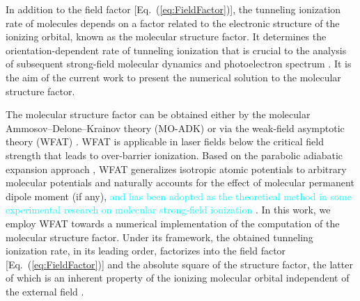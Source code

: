 \documentclass[preprint,12pt]{elsarticle} %
\newcommand{\cyan}[1]{\textcolor{cyan}{#1}}     %
\begin{document}
In addition to the field factor [Eq.~(\ref{eq:FieldFactor})], the tunneling ionization rate of molecules depends on a factor related to the electronic structure of the ionizing orbital, known as the molecular structure factor. It determines the orientation-dependent rate of tunneling ionization that is crucial to the analysis of subsequent strong-field molecular dynamics and photoelectron spectrum \cite{pavicic_direct_2007}. It is the aim of the current work to present the numerical solution to the molecular structure factor.

The molecular structure factor can be obtained either by the molecular Ammosov--Delone--Krainov theory (MO-ADK) \cite{tong_theory_2002, pavicic_direct_2007, holmegaard_photoelectron_2010, johansen_alignment-dependent_2016, zhao_accurate_2017} or via the weak-field asymptotic theory (WFAT) \cite{tolstikhin_theory_2011, madsen_application_2012, madsen_structure_2013, trinh_first-order_2013, madsen_application_2014, tolstikhin_weak-field_2014, tolstikhina_application_2014, saito_structure_2015, trinh_weak-field_2015, dnestryan_integral-equation_2016, svensmark_theory_2016, trinh_first-order_2016, madsen_structure_2017, dnestryan_structure_2018, samygin_weak-field_2018, matsui_weak-field_2021}. WFAT is applicable in laser fields below the critical field strength that leads to over-barrier ionization. Based on the parabolic adiabatic expansion approach \cite{batishchev_atomic_2010}, WFAT generalizes isotropic atomic potentials to arbitrary molecular potentials and naturally accounts for the effect of molecular permanent dipole moment (if any), \cyan{and has been adopted as the theoretical method in some experimental research on molecular strong-field ionization \cite{ohmura_molecular_2014, kraus_observation_2015, walt_role_2015, endo_imaging_2016, fujise_helicity-dependent_2022}}. In this work, we employ WFAT towards a numerical implementation of the computation of the molecular structure factor. Under its framework, the obtained tunneling ionization rate, in its leading order, factorizes into the field factor [Eq.~(\ref{eq:FieldFactor})] and the absolute square of the structure factor, the latter of which is an inherent property of the ionizing molecular orbital independent of the external field \cite{trinh_first-order_2013}.
\end{document}
